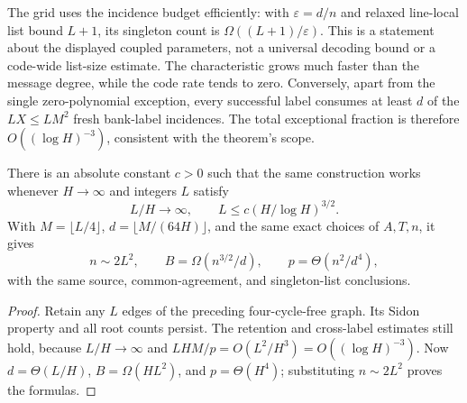 The grid uses the incidence budget efficiently: with
$\varepsilon=d/n$ and relaxed line-local list bound $L+1$, its
singleton count is $\Omega((L+1)/\varepsilon)$.  This is a statement
about the displayed coupled parameters, not a universal decoding bound
or a code-wide list-size estimate.  The characteristic grows much faster
than the message degree, while the code rate tends to zero.
Conversely, apart from the single zero-polynomial exception, every
successful label consumes at least $d$ of the $LX\le LM^2$ fresh
bank-label incidences.  The total exceptional fraction is therefore
$O((\log H)^{-3})$, consistent with the theorem's scope.

\begin{corollary}
\label{cor:translated-grid-gap-range}
There is an absolute constant $c>0$ such that the same construction
works whenever $H\to\infty$ and integers $L$ satisfy
\[
 L/H\longrightarrow\infty,\qquad
 L\le c(H/\log H)^{3/2}.
\]
With $M=\lfloor L/4\rfloor$, $d=\lfloor M/(64H)\rfloor$, and the
same exact choices of $A,T,n$, it gives
\[
 n\sim2L^2,\qquad
 B=\Omega(n^{3/2}/d),\qquad
 p=\Theta(n^2/d^4),
\]
with the same source, common-agreement, and singleton-list conclusions.
\end{corollary}
\begin{proof}
Retain any $L$ edges of the preceding four-cycle-free graph.
Its Sidon property and all root counts persist.  The retention and
cross-label estimates still hold, because $L/H\to\infty$ and
$LHM/p=O(L^2/H^3)=O((\log H)^{-3})$.
Now $d=\Theta(L/H)$, $B=\Omega(HL^2)$, and $p=\Theta(H^4)$;
substituting $n\sim2L^2$ proves the formulas.
\end{proof}
